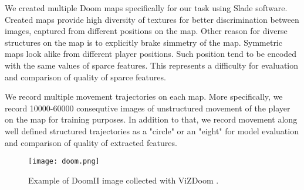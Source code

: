 We created multiple Doom maps specifically for our task using Slade \cite{Slade3} software.
Created maps provide high diversity of textures for better discrimination between images, captured from different positions on the map.
Other reason for diverse structures on the map is to explicitly brake simmetry of the map.
Symmetric maps look alike from different player positions.
Such position tend to be encoded with the same values of sparce features.
This represents a difficulty for evaluation and comparison of quality of sparce features.

We record multiple movement trajectories on each map.
More specifically, we record 10000-60000 consequtive images of unstructured movement of the player on the map for training purposes.
In addition to that, we record movement along well defined structured trajectories as a "circle" or an "eight" for model evaluation and comparison of quality of extracted features.


\begin{figure}
\centering
\texttt{[image: doom.png]} %
\caption{Example of DoomII image collected with ViZDoom \cite{Kempka2016}.}
\label{fig:doom}
\end{figure}





